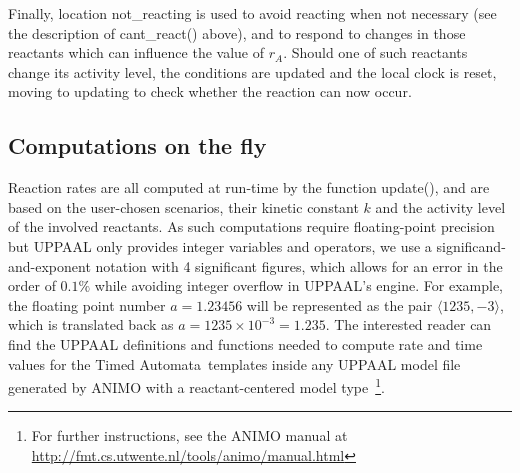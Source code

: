 \documentclass{llncs}
\newcommand{\tas}{Timed Automata}
\begin{document}
Finally, location {\sf not\_reacting} is used to avoid reacting when not necessary (see the description
of {\sf cant\_react()} above), and to respond to changes in those reactants
which can influence the value of $r_A$. Should one of such reactants change its activity level, the
conditions are updated and the local clock is reset, moving to {\sf updating} to check whether the reaction can now
occur.

\subsection{Computations on the fly}\label{sec:rates-ta-model}
Reaction rates are all computed at run-time by the function {\sf update()},
and are based on the user-chosen scenarios, their kinetic constant $k$ and the activity level of the involved reactants.
As such computations require floating-point precision but UPPAAL only provides integer
variables and operators, we use a significand-and-exponent notation with 4 significant figures, which allows for an error
in the order of $0.1 \%$ while 
avoiding integer overflow in UPPAAL's engine.
For example, the floating point number $a = 1.23456$ will be represented as the pair $\langle 1235, -3 \rangle$,
which is translated back as $a = 1235 \times 10^{-3} = 1.235$.
The interested reader can find the UPPAAL definitions and functions needed to compute rate and time values for the \tas\ templates
inside any UPPAAL model file generated by ANIMO with a reactant-centered model type~\footnote{For further instructions, see
the ANIMO manual at \url{http://fmt.cs.utwente.nl/tools/animo/manual.html}}.
\end{document}
